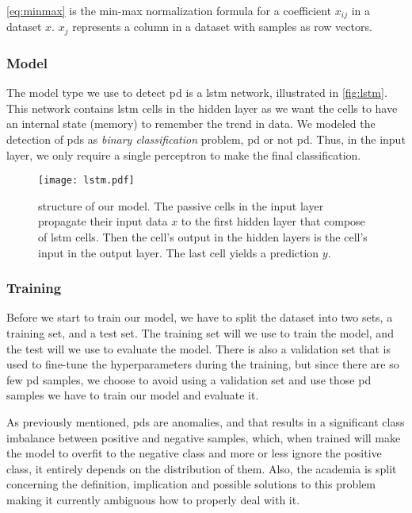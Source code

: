 

\autoref{eq:minmax} is the min-max normalization formula for a coefficient $x_{ij}$ in a dataset $x$. $x_j$ represents a column in a dataset with samples as row vectors.

\subsubsection{Model}
The model type we use to detect \ac{pd} is a \ac{lstm} network, illustrated in \autoref{fig:lstm}. This network contains \ac{lstm} cells in the hidden layer as we want the cells to have an internal state (memory) to remember the trend in data. We modeled the detection of \acp{pd} as \emph{binary classification} problem, \ac{pd} or not \ac{pd}. Thus, in the input layer, we only require a single perceptron to make the final classification.

\begin{figure}[ht]
    \centering
    \texttt{[image: lstm.pdf]}
    \caption[\project's deep learning model]{structure of our model. The passive cells in the input layer propagate their input data $x$ to the first hidden layer that compose of \ac{lstm} cells. Then the cell's output in the hidden layers is the cell's input in the output layer. The last cell yields a prediction $y$.}
    \label{fig:lstm}
\end{figure}

\subsubsection{Training}
Before we start to train our model, we have to split the dataset into two sets, a training set, and a test set. The training set will we use to train the model, and the test will we use to evaluate the model. There is also a validation set that is used to fine-tune the hyperparameters during the training, but since there are so few \ac{pd} samples, we choose to avoid using a validation set and use those \ac{pd} samples we have to train our model and evaluate it.

As previously mentioned, \acp{pd} are anomalies, and that results in a significant class imbalance between positive and negative samples, which, when trained will make the model to overfit to the negative class and more or less ignore the positive class, it entirely depends on the distribution of them. Also, the academia is split concerning the definition, implication and possible solutions to this problem~\cite{tw_imbalance_2} making it currently ambiguous how to properly deal with it.

